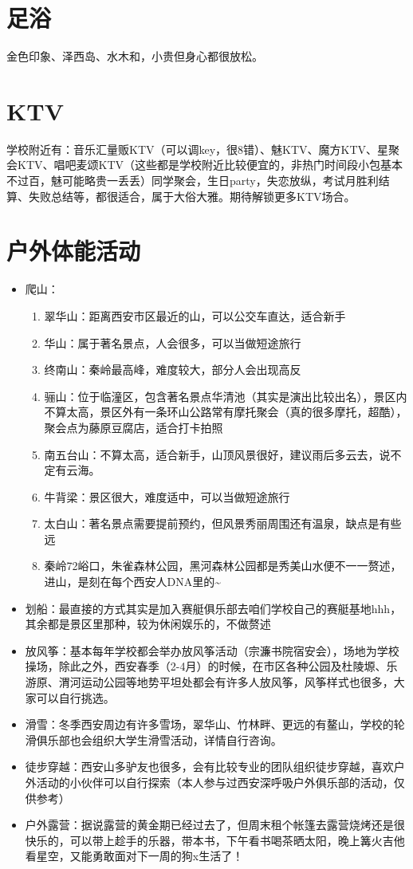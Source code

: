 \documentclass[zihao=-4,fontset=none]{Beautybook-CN}
\begin{document}
\section{足浴}
金色印象、泽西岛、水木和，小贵但身心都很放松。
\section{KTV}

学校附近有：音乐汇量贩KTV（可以调key，很8错）、魅KTV、魔方KTV、星聚会KTV、唱吧麦颂KTV（这些都是学校附近比较便宜的，非热门时间段小包基本不过百，魅可能略贵一丢丢）同学聚会，生日party，失恋放纵，考试月胜利结算、失败总结等，都很适合，属于大俗大雅。期待解锁更多KTV场合。

\section{户外体能活动}
\begin{itemize}
\item 爬山：
\begin{enumerate}
\item 翠华山：距离西安市区最近的山，可以公交车直达，适合新手
\item 华山：属于著名景点，人会很多，可以当做短途旅行
\item 终南山：秦岭最高峰，难度较大，部分人会出现高反
\item 骊山：位于临潼区，包含著名景点华清池（其实是演出比较出名），景区内不算太高，景区外有一条环山公路常有摩托聚会（真的很多摩托，超酷），聚会点为藤原豆腐店，适合打卡拍照
\item 南五台山：不算太高，适合新手，山顶风景很好，建议雨后多云去，说不定有云海。
\item 牛背梁：景区很大，难度适中，可以当做短途旅行
\item 太白山：著名景点需要提前预约，但风景秀丽周围还有温泉，缺点是有些远
\item 秦岭72峪口，朱雀森林公园，黑河森林公园都是秀美山水便不一一赘述，进山，是刻在每个西安人DNA里的\textasciitilde{}
\end{enumerate}

\item 划船：最直接的方式其实是加入赛艇俱乐部去咱们学校自己的赛艇基地hhh，其余都是景区里那种，较为休闲娱乐的，不做赘述
\item 放风筝：基本每年学校都会举办放风筝活动（宗濂书院宿安会），场地为学校操场，除此之外，西安春季（2-4月）的时候，在市区各种公园及杜陵塬、乐游原、渭河运动公园等地势平坦处都会有许多人放风筝，风筝样式也很多，大家可以自行挑选。
\item 滑雪：冬季西安周边有许多雪场，翠华山、竹林畔、更远的有鳌山，学校的轮滑俱乐部也会组织大学生滑雪活动，详情自行咨询。
\item 徒步穿越：西安山多驴友也很多，会有比较专业的团队组织徒步穿越，喜欢户外活动的小伙伴可以自行探索（本人参与过西安深呼吸户外俱乐部的活动，仅供参考）
\item 户外露营：据说露营的黄金期已经过去了，但周末租个帐篷去露营烧烤还是很快乐的，可以带上趁手的乐器，带本书，下午看书喝茶晒太阳，晚上篝火吉他看星空，又能勇敢面对下一周的狗x生活了！
\end{itemize}
\end{document}
